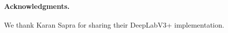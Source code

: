 \documentclass[10pt,twocolumn,letterpaper]{article}
\begin{document}
\renewcommand{\baselinestretch}{0.8}
\vspace{-1mm}
\selectfont
\begin{footnotesize}
\paragraph{\footnotesize Acknowledgments.}
We thank Karan Sapra for sharing their DeepLabV3+ implementation.

\end{footnotesize}
\renewcommand{\baselinestretch}{1.0}

 \FloatBarrier


{\small


}
\end{document}
